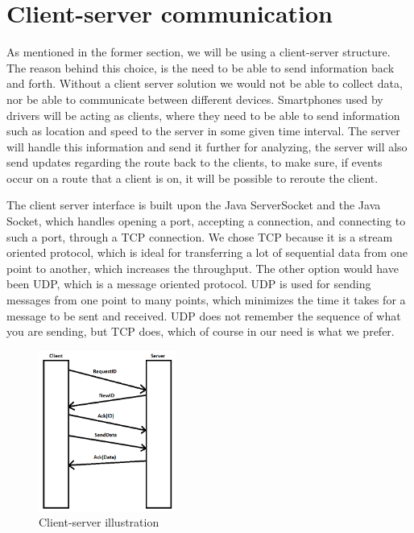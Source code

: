 \section{Client-server communication} 
\label{chap:clientserver}
As mentioned in the former section, we will be using a client-server structure.
The reason behind this choice, is the need to be able to send information back and forth. Without a client server solution we would not be able to collect data, nor be able to communicate between different devices.
Smartphones used by drivers will be acting as clients,
where they need to be able to send information such as location and speed to the server in some given time interval.
The server will handle this information and send it further for analyzing,
the server will also send updates regarding the route back to the clients,
to make sure, if events occur on a route that a client is on, it will be possible to reroute the client.

The client server interface is built upon the Java ServerSocket and the Java Socket,
which handles opening a port, accepting a connection, and connecting to such a port, through a TCP connection. 
We chose TCP because it is a stream oriented protocol,
which is ideal for transferring a lot of sequential data from one point to another, which increases the throughput.
The other option would have been UDP, which is a message oriented protocol.
UDP is used for sending messages from one point to many points,
which minimizes the time it takes for a message to be sent and received.
UDP does not remember the sequence of what you are sending, but TCP does, which of course in our need is what we prefer. 

\begin{figure}[h!]
  \centering
    \includegraphics[width=0.4\textwidth]{figures/clientserver.png}
    \caption{Client-server illustration}
    \label{fig:clientserver}
\end{figure}

